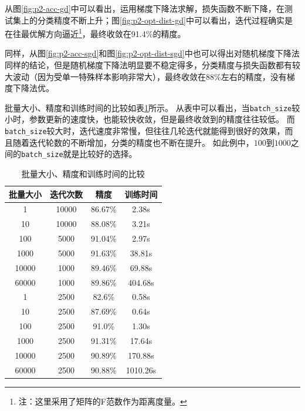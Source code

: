 \documentclass[logo,reportComp]{thesis}
\begin{document}
从图\ref{fig:p2-acc-gd}中可以看出，运用梯度下降法求解，损失函数不断下降，在测试集上的分类精度不断上升；图\ref{fig:p2-opt-dist-gd}中可以看出，迭代过程确实是在往最优解方向逼近\footnote{注：这里采用了矩阵的F范数作为距离度量。}，最终收敛在91.4\%的精度。

同样，从图\ref{fig:p2-acc-sgd}和图\ref{fig:p2-opt-dist-sgd}中也可以得出对随机梯度下降法同样的结论，但是随机梯度下降法明显要不稳定得多，分类精度与损失函数都有较大波动（因为受单一特殊样本影响非常大），最终收敛在88\%左右的精度，没有梯度下降法优。

批量大小、精度和训练时间的比较如表\ref{tab:minibatch}所示。
从表中可以看出，当\verb'batch_size'较小时，参数更新的速度快，也能较快收敛，但是最终收敛到的精度往往较低。
而\verb'batch_size'较大时，迭代速度非常慢，但往往几轮迭代就能得到很好的效果，而且随着迭代轮数的不断增加，分类的精度也不断在提升。
如此例中，$100$到$1000$之间的\verb'batch_size'就是比较好的选择。
\begin{table}[H]
\caption{批量大小、精度和训练时间的比较}
\label{tab:minibatch}
\centering
\begin{tabular}{|c|c|c|c|}\hline
\textbf{批量大小} & \textbf{迭代次数} & \textbf{精度} & \textbf{训练时间}\\\hline
1 & 10000 & 86.67\% & 2.38s\\\hline
10 & 10000 & 88.08\% & 3.21s\\\hline
100 & 5000 & 91.04\% & 2.97s\\\hline
1000 & 5000 & 91.63\% & 38.81s\\\hline
10000 & 1000 & 89.46\% & 69.88s\\\hline
60000 & 1000 & 89.86\% & 404.68s\\\hline
1 & 2500 & 82.6\% & 0.58s\\\hline
10 & 2500 & 87.69\% & 0.64s\\\hline
100 & 2500 & 91.0\% & 1.30s\\\hline
1000 & 2500 & 91.31\% & 17.64s\\\hline
10000 & 2500 & 90.89\% & 170.88s\\\hline
60000 & 2500 & 90.88\% & 1010.26s\\\hline
\end{tabular}
\end{table}
\end{document}
